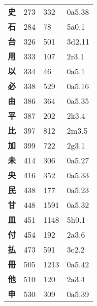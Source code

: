 \begin{longtable}[c]{llll}
    \bfseries 史 & 273 & 332 & 0a5.38\\
    \bfseries 石 & 284 & 78 & 5a0.1\\
    \bfseries 台 & 326 & 501 & 3d2.11\\
    \bfseries 用 & 333 & 107 & 2r3.1\\
    \bfseries 以 & 334 & 46 & 0a5.1\\
    \bfseries 必 & 338 & 529 & 0a5.16\\
    \bfseries 由 & 386 & 364 & 0a5.35\\
    \bfseries 平 & 387 & 202 & 2k3.4\\
    \bfseries 比 & 397 & 812 & 2m3.5\\
    \bfseries 加 & 399 & 722 & 2g3.1\\
    \bfseries 未 & 414 & 306 & 0a5.27\\
    \bfseries 央 & 416 & 352 & 0a5.33\\
    \bfseries 民 & 438 & 177 & 0a5.23\\
    \bfseries 甘 & 448 & 1591 & 0a5.32\\
    \bfseries 皿 & 451 & 1148 & 5h0.1\\
    \bfseries 付 & 454 & 192 & 2a3.6\\
    \bfseries 払 & 473 & 591 & 3c2.2\\
    \bfseries 冊 & 505 & 1213 & 0a5.42\\
    \bfseries 他 & 510 & 120 & 2a3.4\\
    \bfseries 申 & 530 & 309 & 0a5.39\\
  \end{longtable}
